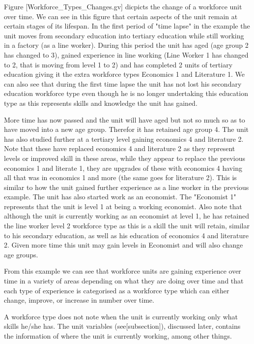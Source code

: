 Figure [Workforce_Types_Changes.gv] dicpicts the change of a workforce unit over time. We can see in this figure that certain aspects of the unit remain at certain stages of its lifespan. In the first period of "time lapse" in the example the unit moves from secondary education into tertiary education while still working in a factory (as a line worker). During this period the unit has aged (age group 2 has changed to 3), gained experience in line working (Line Worker 1 has changed to 2, that is moving from level 1 to 2) and has completed 2 units of tertiary education giving it the extra workforce types Economics 1 and Literature 1. We can also see that during the first time lapse the unit has not lost his secondary education workforce type even though he is no longer undertaking this education type as this represents skills and knowledge the unit has gained. 

More time has now passed and the unit will have aged but not so much so as to have moved into a new age group. Therefor it has retained age group 4. The unit has also studied further at a tertiary level gaining economics 4 and literature 2. Note that these have replaced economics 4 and literature 2 as they represent levels or improved skill in these areas, while they appear to replace the previous economics 1 and literate 1, they are upgrades of these with economics 4 having all that was in economics 1 and more (the same goes for literature 2). This is similar to how the unit gained further experience as a line worker in the previous example. The unit has also started work as an economist. The "Economist 1" represents that the unit is level 1 at being a working economist. Also note that although the unit is currently working as an economist at level 1, he has retained the line worker level 2 workforce type as this is a skill the unit will retain, similar to his secondary education, as well as his education of economics 4 and literature 2. Given more time this unit may gain levels in Economist and will also change age groups. 

From this example we can see that workforce units are gaining experience over time in a variety of areas depending on what they are doing over time and that each type of experience is categorised as a workforce type which can either change, improve, or increase in number over time. 

A workforce type does not note when the unit is currently working only what skills he/she has. The unit variables (see[subsection]), discussed later, contains the information of where the unit is currently working, among other things.

